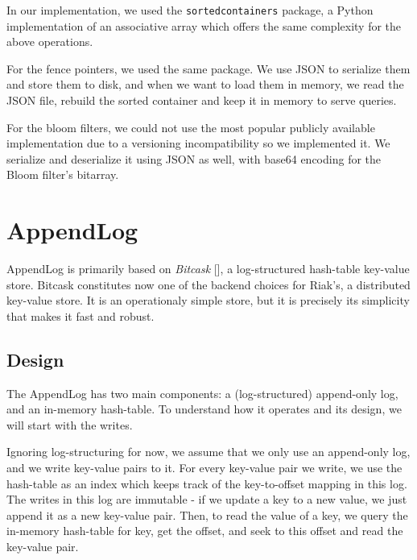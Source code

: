 In our implementation, we used the \verb|sortedcontainers| package, a Python implementation of an associative array which offers the same complexity for the above operations.

For the fence pointers, we used the same package. We use JSON to serialize them and store them to disk, and when we want to load them in memory, we read the JSON file, rebuild the sorted container and keep it in memory to serve queries.

For the bloom filters, we could not use the most popular publicly available implementation due to a versioning incompatibility so we implemented it. We serialize and deserialize it using JSON as well, with base64 encoding for the Bloom filter's bitarray.




\section{AppendLog}

AppendLog is primarily based on \textit{Bitcask} [\cite{bitcask}], a log-structured hash-table key-value store. Bitcask constitutes now one of the backend choices for Riak's, a distributed key-value store. It is an operationaly simple store, but it is precisely its simplicity that makes it fast and robust.

\subsection{Design}

The AppendLog has two main components: a (log-structured) append-only log, and an in-memory hash-table. To understand how it operates and its design, we will start with the writes.

Ignoring log-structuring for now, we assume that we only use an append-only log, and we write key-value pairs to it.
For every key-value pair we write, we use the hash-table as an index which keeps track of the key-to-offset mapping in this log. The writes in this log are immutable - if we update a key to a new value, we just append it as a new key-value pair. Then, to read the value of a key, we query the in-memory hash-table for key, get the offset, and seek to this offset and read the key-value pair.

